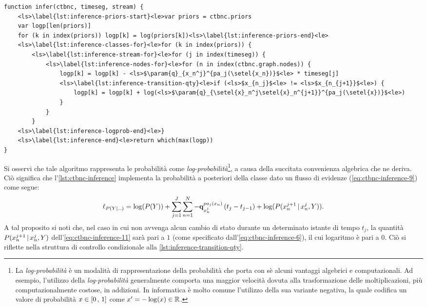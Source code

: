 \vspace*{8pt}\begin{lstlisting}[caption={[Inferenza su un classificatore \acs{CTBN}]Inferenza su un classificatore \acs{CTBN} (\acs{CTBNC}).},label=lst:ctbnc-inference, language=pseudo]
function infer(ctbnc, timeseg, stream) {
    <ls>\label{lst:inference-priors-start}<le>var priors = ctbnc.priors
    var logp[len(priors)]
    for (k in index(priors)) logp[k] = log(priors[k])<ls>\label{lst:inference-priors-end}<le>
    <ls>\label{lst:inference-classes-for}<le>for (k in index(priors)) {
        <ls>\label{lst:inference-stream-for}<le>for (j in index(timeseg)) {
            <ls>\label{lst:inference-nodes-for}<le>for (n in index(ctbnc.graph.nodes)) {
                logp[k] = logp[k] - <ls>$\param{q}_{x_n^j}^{pa_j(\setel{x_n})}$<le> * timeseg[j]
                <ls>\label{lst:inference-transition-qty}<le>if (<ls>$x_{n_j}$<le> != <ls>$x_{n_{j+1}}$<le>) {
                    logp[k] = logp[k] + log(<ls>$\param{q}_{\setel{x}_n^j\setel{x}_n^{j+1}}^{pa_j(\setel{x})}$<le>)
                }
            }
        }
    <ls>\label{lst:inference-logprob-end}<le>}
    <ls>\label{lst:inference-end}<le>return which(max(logp))
}
\end{lstlisting}\normalsize

Si osservi che tale algoritmo rappresenta le probabilità come \emph{log-probabilità}\footnote{La \emph{log-probabilità} è un modalità di rappresentazione della probabilità che porta con sè alcuni vantaggi algebrici e computazionali. Ad esempio, l'utilizzo della \emph{log-probabilità} generalmente comporta una maggior velocità dovuta alla trasformazione delle moltiplicazioni, più computazionalmente costose, in addizioni. In informatica è molto comune l'utilizzo della sua variante negativa, la quale codifica un valore di probabilità $\mathnormal{x} \in [0\,,\,1]$ come $\mathnormal{x}^{\prime}=-\log(\mathnormal{x}) \in \mathbb{R}$.}, a causa della succitata convenienza algebrica che ne deriva. Ciò significa che l'\autoref{lst:ctbnc-inference} implementa la probabilità a posteriori della classe dato un flusso di evidenze (\autoref{eq:ctbnc-inference-9}) come segue:
\small
\begin{equation}\label{eq:ctbnc-inference-11}
\ell_{P(\mathnormal{Y}|\dots\negthinspace{})} = \log (P(\mathnormal{Y})) + \sum_{j=1}^{J}\sum_{n=1}^N-\boldsymbol{\textbf{\text{q}}}_{\mathnormal{x}_n^j}^{pa_j(\mathnormal{x}_n)}\,(t_j - t_{j-1}) + \log (P(\mathnormal{x}_n^{j+1}\,\arrowvert\,\mathnormal{x}_n^j,\mathnormal{Y}))\text{\normalsize .}
\end{equation}
\normalsize
A tal proposito si noti che, nel caso in cui non avvenga alcun cambio di stato durante un determinato istante di tempo $t_j$, la quantità $P(\mathnormal{x}_n^{j+1}\,\arrowvert\,\mathnormal{x}_n^j,\mathnormal{Y})$ dell'\autoref{eq:ctbnc-inference-11} sarà pari a $1$ (come specificato dall'\autoref{eq:ctbnc-inference-6}), il cui logaritmo è pari a $0$. Ciò si riflette nella struttura di controllo condizionale alla \autoref{lst:inference-transition-qty}.

